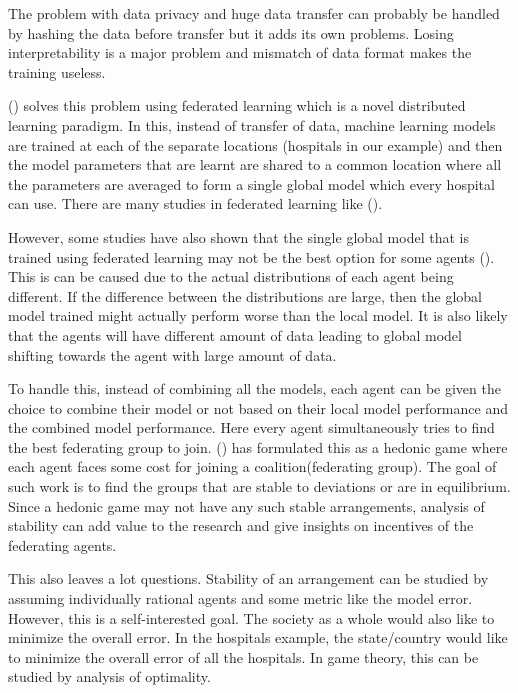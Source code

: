 \documentclass{article}
\begin{document}
The problem with data privacy and huge data transfer can probably be handled by hashing the data before transfer but it adds its own problems. Losing interpretability is a major problem and mismatch of data format makes the training useless.

(\cite{mcmahan2016communicationefficient}) solves this problem using federated learning which is a novel distributed learning paradigm. In this, instead of transfer of data, machine learning models are trained at each of the separate locations (hospitals in our example) and then the model parameters that are learnt are shared to a common location where all the parameters are averaged to form a single global model which every hospital can use. There are many studies in federated learning like (\cite{Li_2020, kairouz2019advances, fedsurvey}).

However, some studies have also shown that the single global model that is trained using federated learning may not be the best option for some agents (\cite{yu2020salvaging, bagdasaryan2019differential, mohri2019agnostic, li2019fair}). This is can be caused due to the actual distributions of each agent being different. If the difference between the distributions are large, then the global model trained might actually perform worse than the local model. It is also likely that the agents will have different amount of data leading to global model shifting towards the agent with large amount of data.

To handle this, instead of combining all the models, each agent can be given the choice to combine their model or not based on their local model performance and the combined model performance. Here every agent simultaneously tries to find the best federating group to join. (\cite{hasan2021incentive}) has formulated this as a hedonic game where each agent faces some cost for joining a coalition(federating group). The goal of such work is to find the groups that are stable to deviations or are in equilibrium. Since a hedonic game may not have any such stable arrangements, analysis of stability can add value to the research and give insights on incentives of the federating agents.

This also leaves a lot questions. Stability of an arrangement can be studied by assuming individually rational agents and some metric like the model error. However, this is a self-interested goal. The society as a whole would also like to minimize the overall error. In the hospitals example, the state/country would like to minimize the overall error of all the hospitals. In game theory, this can be studied by analysis of optimality.
\end{document}
